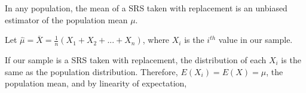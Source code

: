\begin{thm} In any population, the mean of a SRS taken with replacement is an unbiased estimator of the population mean $\mu$.
\end{thm}
\begin{pf} Let $\widehat{\mu} = \overline{X} = \frac{1}{n}(X_1 + X_2 + ... + X_n)$, where $X_i$ is the $i^{th}$ value in our sample.
\par
\noindent If our sample is a SRS taken with replacement, the distribution of each $X_i$ is the same as the population distribution. Therefore, $E(X_i) = E(X) = \mu$, the population mean, and by linearity of expectation,
\end{pf}

